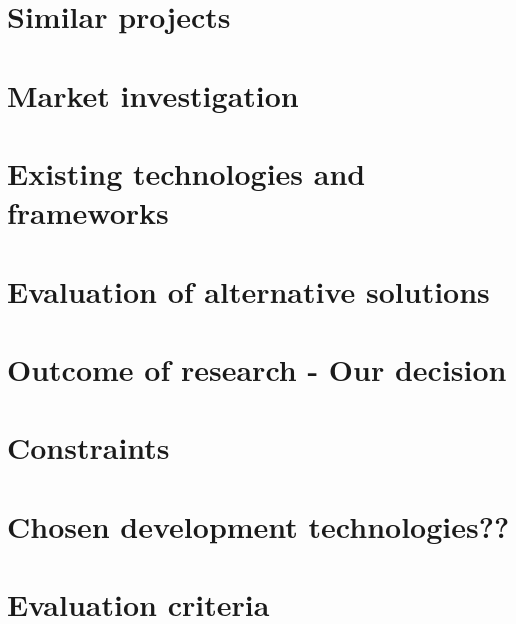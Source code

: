 \section{Similar projects}
\section{Market investigation}
\section{Existing technologies and frameworks}
\section{Evaluation of alternative solutions}
\section{Outcome of research - Our decision}
\section{Constraints}
\section{Chosen development technologies??}
\section{Evaluation criteria}